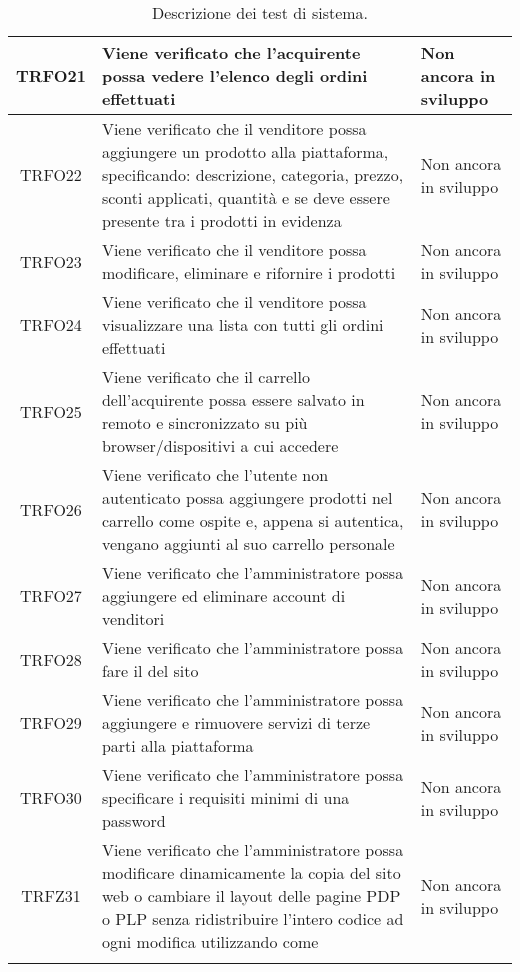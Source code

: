 \begin{longtable}{|c| C{10cm} |C{3cm}|}
	TRFO21 & Viene verificato che l'acquirente possa vedere l'elenco degli ordini effettuati & Non ancora in sviluppo\\ \hline
	TRFO22 & Viene verificato che il venditore possa aggiungere un prodotto alla piattaforma, specificando: descrizione, categoria, prezzo, sconti applicati, quantità e se deve essere presente tra i prodotti in evidenza & Non ancora in sviluppo\\ \hline
    TRFO23 & Viene verificato che il venditore possa modificare, eliminare e rifornire i prodotti & Non ancora in sviluppo\\ \hline
    TRFO24 & Viene verificato che il venditore possa visualizzare una lista con tutti gli ordini effettuati & Non ancora in sviluppo\\ \hline
    TRFO25 & Viene verificato che il carrello dell'acquirente possa essere salvato in remoto e sincronizzato su più browser/dispositivi a cui accedere & Non ancora in sviluppo\\ \hline
    TRFO26 & Viene verificato che l'utente non autenticato possa aggiungere prodotti nel carrello come ospite e, appena si autentica, vengano aggiunti al suo carrello personale & Non ancora in sviluppo\\ \hline
    TRFO27 & Viene verificato che l'amministratore possa aggiungere ed eliminare account di venditori & Non ancora in sviluppo\\ \hline
    TRFO28 & Viene verificato che l'amministratore possa fare il  del sito & Non ancora in sviluppo\\ \hline
    TRFO29 & Viene verificato che l'amministratore possa aggiungere e rimuovere servizi di terze parti alla piattaforma & Non ancora in sviluppo\\ \hline
    TRFO30 & Viene verificato che l'amministratore possa specificare i requisiti minimi di una password & Non ancora in sviluppo\\ \hline
    TRFZ31 & Viene verificato che l'amministratore possa modificare dinamicamente la copia del sito web o cambiare il layout delle pagine PDP o PLP senza ridistribuire l'intero codice ad ogni modifica utilizzando  come  & Non ancora in sviluppo\\ \hline
    \caption{Descrizione dei test di sistema.}
\end{longtable}

